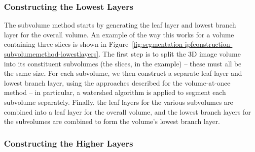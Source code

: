\subsubsection{Constructing the Lowest Layers}

The subvolume method starts by generating the leaf layer and lowest branch layer for the overall volume. An example of the way this works for a volume containing three slices is shown in Figure~\ref{fig:segmentation-ipfconstruction-subvolumemethod-lowestlayers}. The first step is to split the 3D image volume into its constituent subvolumes (the slices, in the example) -- these must all be the same size. For each subvolume, we then construct a separate leaf layer and lowest branch layer, using the approaches described for the volume-at-once method -- in particular, a watershed algorithm is applied to segment each subvolume separately. Finally, the leaf layers for the various subvolumes are combined into a leaf layer for the overall volume, and the lowest branch layers for the subvolumes are combined to form the volume's lowest branch layer.


\subsubsection{Constructing the Higher Layers}

